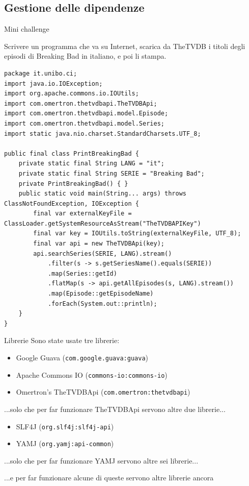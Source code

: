 \documentclass[presentation]{beamer}
\begin{document}
\subsection{Gestione delle dipendenze}

\begin{frame}[fragile]{Mini challenge}
\begin{block}{}
Scrivere un programma che va su Internet, scarica da TheTVDB i titoli degli episodi di Breaking Bad in italiano, e poi li stampa.
\end{block}

\pause
\begin{verbatim}
package it.unibo.ci;
import java.io.IOException;
import org.apache.commons.io.IOUtils;
import com.omertron.thetvdbapi.TheTVDBApi;
import com.omertron.thetvdbapi.model.Episode;
import com.omertron.thetvdbapi.model.Series;
import static java.nio.charset.StandardCharsets.UTF_8;

public final class PrintBreakingBad {
    private static final String LANG = "it";
    private static final String SERIE = "Breaking Bad";
    private PrintBreakingBad() { }
    public static void main(String... args) throws ClassNotFoundException, IOException {
        final var externalKeyFile = ClassLoader.getSystemResourceAsStream("TheTVDBAPIKey")
        final var key = IOUtils.toString(externalKeyFile, UTF_8);
        final var api = new TheTVDBApi(key);
        api.searchSeries(SERIE, LANG).stream()
            .filter(s -> s.getSeriesName().equals(SERIE))
            .map(Series::getId)
            .flatMap(s -> api.getAllEpisodes(s, LANG).stream())
            .map(Episode::getEpisodeName)
            .forEach(System.out::println);
    }
}
\end{verbatim}
\end{frame}

\begin{frame}{Librerie}
    Sono state usate tre librerie:
    \begin{itemize}
        \item Google Guava (\texttt{com.google.guava:guava})
        \item Apache Commons IO (\texttt{commons-io:commons-io})
        \item Omertron's TheTVDBApi (\texttt{com.omertron:thetvdbapi})
    \end{itemize}
    ...solo che per far funzionare TheTVDBApi servono altre due librerie...
    \begin{itemize}
        \item SLF4J (\texttt{org.slf4j:slf4j-api})
        \item YAMJ (\texttt{org.yamj:api-common})
    \end{itemize}
    ...solo che per far funzionare YAMJ servono altre sei librerie...
    
    ...e per far funzionare alcune di queste servono altre librerie ancora
\end{frame}
\end{document}
